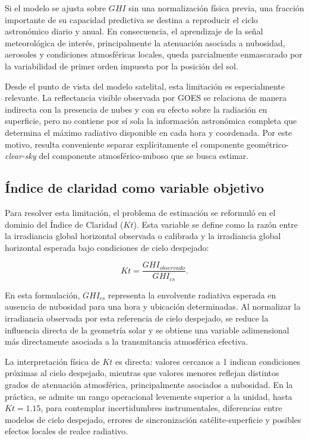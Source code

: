 \documentclass[../main.tex]{subfiles}
\begin{document}
Si el modelo se ajusta sobre $GHI$ sin una normalización física previa, una fracción importante de su capacidad predictiva se destina a reproducir el ciclo astronómico diario y anual. En consecuencia, el aprendizaje de la señal meteorológica de interés, principalmente la atenuación asociada a nubosidad, aerosoles y condiciones atmosféricas locales, queda parcialmente enmascarado por la variabilidad de primer orden impuesta por la posición del sol.

Desde el punto de vista del modelo satelital, esta limitación es especialmente relevante. La reflectancia visible observada por GOES se relaciona de manera indirecta con la presencia de nubes y con su efecto sobre la radiación en superficie, pero no contiene por sí sola la información astronómica completa que determina el máximo radiativo disponible en cada hora y coordenada. Por este motivo, resulta conveniente separar explícitamente el componente geométrico-\textit{clear-sky} del componente atmosférico-nuboso que se busca estimar.

\subsection{Índice de claridad como variable objetivo}

Para resolver esta limitación, el problema de estimación se reformuló en el dominio del Índice de Claridad ($Kt$). Esta variable se define como la razón entre la irradiancia global horizontal observada o calibrada y la irradiancia global horizontal esperada bajo condiciones de cielo despejado:

\begin{equation}
Kt = \frac{GHI_{observado}}{GHI_{cs}}.
\end{equation}

En esta formulación, $GHI_{cs}$ representa la envolvente radiativa esperada en ausencia de nubosidad para una hora y ubicación determinadas. Al normalizar la irradiancia observada por esta referencia de cielo despejado, se reduce la influencia directa de la geometría solar y se obtiene una variable adimensional más directamente asociada a la transmitancia atmosférica efectiva.

La interpretación física de $Kt$ es directa: valores cercanos a 1 indican condiciones próximas al cielo despejado, mientras que valores menores reflejan distintos grados de atenuación atmosférica, principalmente asociados a nubosidad. En la práctica, se admite un rango operacional levemente superior a la unidad, hasta $Kt = 1.15$, para contemplar incertidumbres instrumentales, diferencias entre modelos de cielo despejado, errores de sincronización satélite-superficie y posibles efectos locales de realce radiativo.
\end{document}
